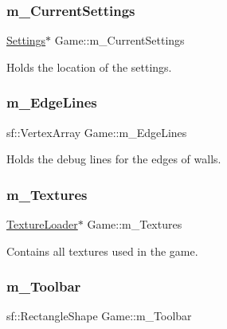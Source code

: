 \subsubsection{\texorpdfstring{m\+\_\+\+Current\+Settings}{m\_CurrentSettings}}
{\footnotesize\ttfamily \hyperlink{class_settings}{Settings}$\ast$ Game\+::m\+\_\+\+Current\+Settings\hspace{0.3cm}{\ttfamily [private]}}



Holds the location of the settings. 

\mbox{\label{class_game_a2b3db353c1e39c1950bf71a787a87992}} 
\subsubsection{\texorpdfstring{m\+\_\+\+Edge\+Lines}{m\_EdgeLines}}
{\footnotesize\ttfamily sf\+::\+Vertex\+Array Game\+::m\+\_\+\+Edge\+Lines\hspace{0.3cm}{\ttfamily [private]}}



Holds the debug lines for the edges of walls. 

\mbox{\label{class_game_a9e1e067209180aba519f41791fc991d7}} 
\subsubsection{\texorpdfstring{m\+\_\+\+Textures}{m\_Textures}}
{\footnotesize\ttfamily \hyperlink{class_texture_loader}{Texture\+Loader}$\ast$ Game\+::m\+\_\+\+Textures\hspace{0.3cm}{\ttfamily [private]}}



Contains all textures used in the game. 

\mbox{\label{class_game_a7570ce885eabdfe6ce46270e0b748482}} 
\subsubsection{\texorpdfstring{m\+\_\+\+Toolbar}{m\_Toolbar}}
{\footnotesize\ttfamily sf\+::\+Rectangle\+Shape Game\+::m\+\_\+\+Toolbar\hspace{0.3cm}{\ttfamily [private]}}



